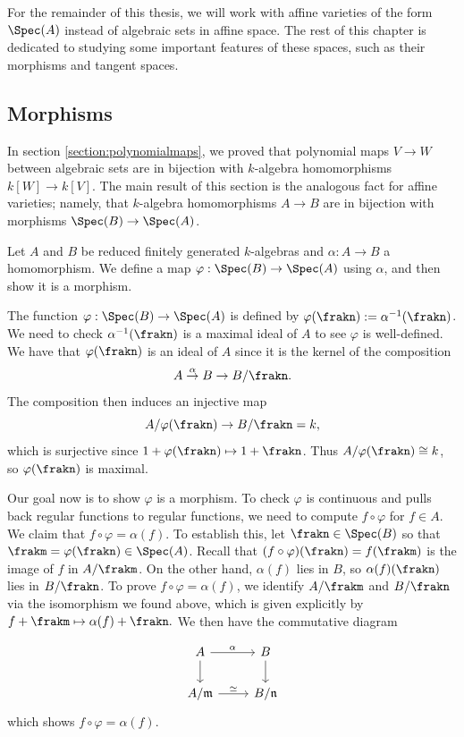 \documentclass[12pt]{amsart}
\theoremstyle{plain}
\theoremstyle{definition}
\begin{document}
For the remainder of this thesis, we will work with affine varieties of the form $\Spec(A)$ instead of algebraic sets in affine space.
The rest of this chapter is dedicated to studying some important features of these spaces, such as their morphisms and tangent spaces.





\subsection{Morphisms}\label{section:morphisms}
In section \ref{section:polynomialmaps}, we proved that polynomial maps $V \to W$ between algebraic sets are in bijection with $k$-algebra homomorphisms $k[W] \to k[V]$.
The main result of this section is the analogous fact for affine varieties; 
namely, that $k$-algebra homomorphisms $A \to B$ are in bijection with morphisms $\Spec(B) \to \Spec(A)$.

Let $A$ and $B$ be reduced finitely generated $k$-algebras and $\alpha : A \to B$ a homomorphism.
We define a map $\varphi : \Spec(B) \to \Spec(A)$ using $\alpha$, and then show it is a morphism.

The function $\varphi : \Spec(B) \to \Spec(A)$ is defined by $\varphi(\frakn):=\alpha^{-1}(\frakn)$.
We need to check $\alpha^{-1}(\frakn)$ is a maximal ideal of $A$ to see $\varphi$ is well-defined.
We have that $\varphi(\frakn)$ is an ideal of $A$ since it is the kernel of the composition
$$A \overset{\alpha}{\to} B \to B / \frakn.$$ 
The composition then induces an injective map
$$A/\varphi(\frakn) \to B/\frakn = k,$$
which is surjective since $1 + \varphi(\frakn) \mapsto 1 + \frakn$.
Thus $A/\varphi(\frakn) \cong k$, so $\varphi(\frakn)$ is maximal.

Our goal now is to show $\varphi$ is a morphism.
To check $\varphi$ is continuous and pulls back regular functions to regular functions, we need to compute $f \circ \varphi$ for $f \in A$.
We claim that $f \circ \varphi = \alpha(f)$.
To establish this, let $\frakn \in \Spec(B)$ so that $\frakm =\varphi(\frakn) \in \Spec(A)$.
Recall that $(f\circ\varphi)(\frakn) = f(\frakm)$ is the image of $f$ in $A/\frakm$.
On the other hand, $\alpha(f)$ lies in $B$, so $\alpha(f)(\frakn)$ lies in $B/\frakn$.
To prove $f \circ \varphi = \alpha(f)$, we identify $A/\frakm$ and $B/\frakn$ via the isomorphism we found above, which is given explicitly by $f + \frakm \mapsto \alpha(f) + \frakn.$
We then have the commutative diagram

\[\begin{tikzcd}
	A & B \\
	{A/\mathfrak{m}} & {B/\mathfrak{n}}
	\arrow["\alpha", from=1-1, to=1-2]
	\arrow[from=1-1, to=2-1]
	\arrow[from=1-2, to=2-2]
	\arrow["\simeq", from=2-1, to=2-2]
\end{tikzcd}\]
which shows $f\circ\varphi=\alpha(f)$.
\end{document}
